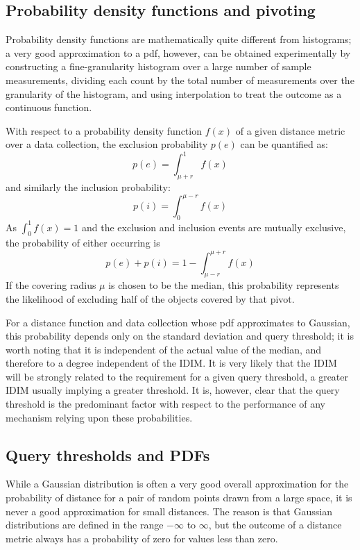 \subsection{Probability density functions and pivoting}
Probability density functions are mathematically quite different from histograms; a very good approximation to a pdf, however, can be obtained experimentally by constructing a fine-granularity histogram over a large number of sample measurements, dividing each count by the total number of measurements over the granularity of the histogram, and using interpolation to treat the outcome as a continuous function. 

With respect to a probability density function $f(x)$ of a given distance metric over a data collection, the exclusion probability $p(e)$ can be quantified as:
\begin{equation}
	p(e) = \int_{\mu + r}^1 f(x)
\end{equation}
and similarly the inclusion probability:
\begin{equation}
	p(i) = \int_0^{\mu - r} f(x)
\end{equation}
As $\int_0^1 f(x) = 1$ and the exclusion and inclusion events are mutually exclusive, the probability of either occurring is
\begin{equation}
	p(e) + p(i) = 1 - \int_{\mu - r}^{\mu + r} f(x)
\end{equation}
If the covering radius $\mu$ is chosen to be the median, this probability represents the likelihood of excluding half of the objects covered by that pivot.

For a distance function and data collection whose pdf approximates to Gaussian, this probability depends only on the standard deviation and query threshold; it is worth noting that it is independent of the actual value of the median, and therefore to a degree independent of the IDIM.
It is very likely that the IDIM will be strongly related to the requirement for a given query threshold, a greater IDIM usually implying a greater threshold. It is, however, clear that the query threshold is the predominant factor with respect to the performance of any mechanism relying upon these probabilities.

\subsection{Query thresholds and PDFs}
While a Gaussian distribution is often a very good overall approximation for the probability of distance for a pair of random points drawn from a large space, it is never a good approximation for small distances. The reason is that Gaussian distributions are defined in the range $-\infty$ to $\infty$, but the outcome of a distance metric always has a probability of zero for values less than zero.

